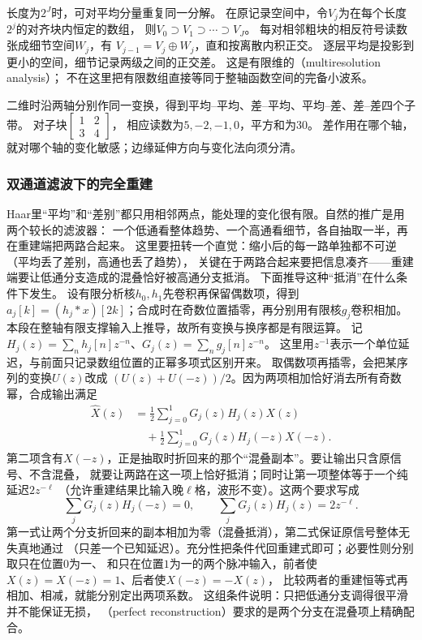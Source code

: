 长度为$2^J$时，可对平均分量重复同一分解。
在原记录空间中，令$V_j$为在每个长度$2^j$的对齐块内恒定的数组，
则$V_0\supset V_1\supset\cdots\supset V_J$。
每对相邻粗块的相反符号读数张成细节空间$W_j$，有
$V_{j-1}=V_j\oplus W_j$，直和按离散内积正交。
逐层平均是投影到更小的空间，细节记录两级之间的正交差。
这是有限维的（multiresolution analysis）；
不在这里把有限数组直接等同于整轴函数空间的完备小波系。

二维时沿两轴分别作同一变换，得到平均--平均、差--平均、平均--差、差--差四个子带。
对子块$\begin{bmatrix}1&2\\3&4\end{bmatrix}$，
相应读数为$5,-2,-1,0$，平方和为$30$。
差作用在哪个轴，就对哪个轴的变化敏感；边缘延伸方向与变化法向须分清。

\subsubsection{双通道滤波下的完全重建}
\label{sec:signal-perfect-reconstruction}
Haar里“平均”和“差别”都只用相邻两点，能处理的变化很有限。自然的推广是用两个较长的滤波器：
一个低通看整体趋势、一个高通看细节，各自抽取一半，再在重建端把两路合起来。
这里要扭转一个直觉：缩小后的每一路单独都不可逆（平均丢了差别，高通也丢了趋势），
关键在于两路合起来要把信息凑齐——重建端要让低通分支造成的混叠恰好被高通分支抵消。
下面推导这种“抵消”在什么条件下发生。
设有限分析核$h_0,h_1$先卷积再保留偶数项，得到
$a_j[k]=(h_j*x)[2k]$；合成时在奇数位置插零，再分别用有限核$g_j$卷积相加。
本段在整轴有限支撑输入上推导，故所有变换与换序都是有限运算。
记$H_j(z)=\sum_nh_j[n]z^{-n}$、$G_j(z)=\sum_ng_j[n]z^{-n}$。
这里用$z^{-1}$表示一个单位延迟，与前面只记录数组位置的正幂多项式区别开来。
取偶数项再插零，会把某序列的变换$U(z)$改成
$(U(z)+U(-z))/2$。因为两项相加恰好消去所有奇数幂，合成输出满足
\begin{equation}
 \begin{aligned}
 \widehat X(z)&=\frac12\sum_{j=0}^1G_j(z)H_j(z)X(z)\\
 &\quad+\frac12\sum_{j=0}^1G_j(z)H_j(-z)X(-z).
 \end{aligned}
 \label{eq:signal-two-channel-transfer}
\end{equation}
第二项含有$X(-z)$，正是抽取时折回来的那个“混叠副本”。要让输出只含原信号、不含混叠，
就要让两路在这一项上恰好抵消；同时让第一项整体等于一个纯延迟$2z^{-\ell}$
（允许重建结果比输入晚$\ell$格，波形不变）。这两个要求写成
\begin{equation}
 \sum_jG_j(z)H_j(-z)=0,\qquad
 \sum_jG_j(z)H_j(z)=2z^{-\ell}.
 \label{eq:signal-perfect-reconstruction-conditions}
\end{equation}
第一式让两个分支折回来的副本相加为零（混叠抵消），第二式保证原信号整体无失真地通过
（只差一个已知延迟）。充分性把条件代回重建式即可；必要性则分别取只在位置$0$为一、
和只在位置$1$为一的两个脉冲输入，前者使$X(z)=X(-z)=1$、后者使$X(-z)=-X(z)$，
比较两者的重建恒等式再相加、相减，就能分别定出两项系数。
这组条件说明：只把低通分支调得很平滑并不能保证无损，
（perfect reconstruction）要求的是两个分支在混叠项上精确配合。

